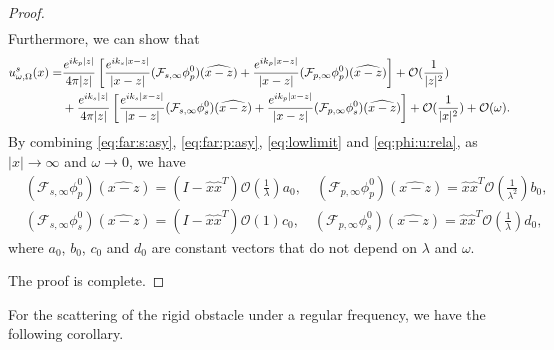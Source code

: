 \documentclass[a4paper,11pt]{article}
\newcommand{\mO}{\mathcal{O}}
\theoremstyle{remark}
\theoremstyle{definition}
\numberwithin{equation}{section}
\begin{document}
\begin{proof}
\begin{align*}
\end{align*}
Furthermore, we can show that
\begin{align}
 u_{\omega,\Omega}^s(x)  =& \frac{e^{ik_p|z|}}{4 \pi |z|} \left[ \frac{e^{ik_s|x-z|}}{|x-z|} (\mathcal{F}_{s,\infty}\phi_{p}^0)(\widehat{x-z}) + \frac{e^{ik_p|x-z|}}{|x-z|} (\mathcal{F}_{p,\infty}\phi_{p}^0)(\widehat{x-z})\right] + \mO(\frac{1}{|z|^2}) \label{eq:rigid:fullexpan} \\
 &+\frac{e^{ik_s|z|}}{4 \pi |z|} \left[ \frac{e^{ik_s|x-z|}}{|x-z|} (\mathcal{F}_{s,\infty}\phi_{s}^0)(\widehat{x-z}) + \frac{e^{ik_p|x-z|}}{|x-z|} (\mathcal{F}_{p,\infty}\phi_{s}^0)(\widehat{x-z})\right] + \mathcal{O}(\frac{1}{|x|^2}) + \mO(\omega). \notag
\end{align}
By combining \eqref{eq:far:s:asy}, \eqref{eq:far:p:asy}, \eqref{eq:lowlimit} and \eqref{eq:phi:u:rela}, as $|x| \rightarrow \infty$ and $\omega \rightarrow 0$, we have
\begin{align*}
&(\mathcal{F}_{s,\infty}\phi_{p}^0)(\widehat{x-z}) =(I -\hat{x}\hat{x}^T)\mO(\frac{1}{\lambda})a_0 , \quad (\mathcal{F}_{p,\infty}\phi_{p}^0)(\widehat{x-z}) = \hat{x}\hat{x}^T\mO(\frac{1}{\lambda^2})b_0, \\
&(\mathcal{F}_{s,\infty}\phi_{s}^0)(\widehat{x-z}) =(I- \hat{x}\hat{x}^{T})\mO(1)c_0, \quad  (\mathcal{F}_{p,\infty}\phi_{s}^0)(\widehat{x-z}) =\hat{x}\hat{x}^T \mO(\frac{1}{\lambda})d_0,
\end{align*}
where $a_0$, $b_0$, $c_0$ and $d_0$ are constant vectors that do not depend on $\lambda$ and $\omega$.

The proof is complete.

\end{proof}

For the scattering of the rigid obstacle under a regular frequency, we have the following corollary.
\end{document}
